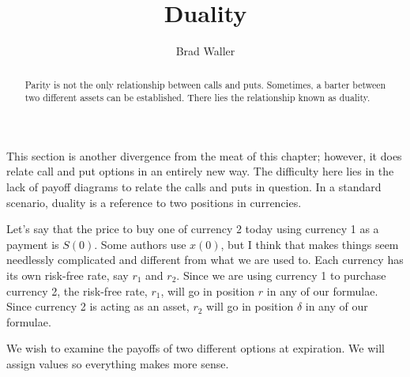 \documentclass{ximera}
\author{Brad Waller}
\title{Duality}
\begin{document}
\begin{abstract}
Parity is not the only relationship between calls and puts. Sometimes, a barter between two different assets can be established. There lies the relationship known as duality.
\end{abstract}

\maketitle

This section is another divergence from the meat of this chapter; however, it does relate call and put options in an entirely new way. The difficulty here lies in the lack of payoff diagrams to relate the calls and puts in question. In a standard scenario, duality is a reference to two positions in currencies. 

Let's say that the price to buy one of currency 2 today using currency 1 as a payment is $S(0)$. Some authors use $x(0)$, but I think that makes things seem needlessly complicated and different from what we are used to. Each currency has its own risk-free rate, say $r_1$ and $r_2$. Since we are using currency 1 to purchase currency 2, the risk-free rate, $r_1$, will go in position $r$ in any of our formulae. Since currency 2 is acting as an asset, $r_2$ will go in position $\delta$ in any of our formulae. 

We wish to examine the payoffs of two different options at expiration. We will assign values so everything makes more sense.
\end{document}
